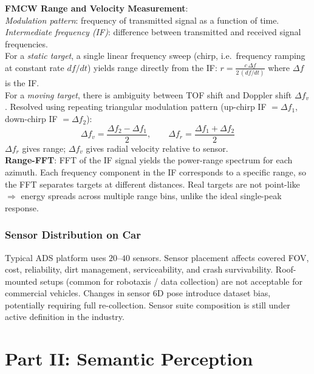 \documentclass{article}
\begin{document}
\textbf{FMCW Range and Velocity Measurement}:\\
\textit{Modulation pattern}: frequency of transmitted signal as a function of time.\\
\textit{Intermediate frequency (IF)}: difference between transmitted and received signal frequencies.\\
 
For a \textit{static target}, a single linear frequency sweep (chirp, i.e.\ frequency ramping at constant rate $df/dt$) yields range directly from the IF: $r = \frac{c\,\Delta f}{2\,(df/dt)}$ where $\Delta f$ is the IF.\\
 
For a \textit{moving target}, there is ambiguity between TOF shift and Doppler shift $\Delta f_v$. Resolved using repeating triangular modulation pattern (up-chirp IF $= \Delta f_1$, down-chirp IF $= \Delta f_2$):
\begin{equation}
    \Delta f_v = \frac{\Delta f_2 - \Delta f_1}{2}, \qquad
    \Delta f_r = \frac{\Delta f_1 + \Delta f_2}{2}
\end{equation}
$\Delta f_r$ gives range; $\Delta f_v$ gives radial velocity relative to sensor.\\

\textbf{Range-FFT}: FFT of the IF signal yields the power-range spectrum for each azimuth. Each frequency component in the IF corresponds to a specific range, so the FFT separates targets at different distances. Real targets are not point-like $\Rightarrow$ energy spreads across multiple range bins, unlike the ideal single-peak response.

\subsubsection{Sensor Distribution on Car}
Typical ADS platform uses $20$--$40$ sensors. Sensor placement affects covered FOV, cost, reliability, dirt management, serviceability, and crash survivability. Roof-mounted setups (common for robotaxis / data collection) are not acceptable for commercial vehicles. Changes in sensor 6D pose introduce dataset bias, potentially requiring full re-collection. Sensor suite composition is still under active definition in the industry.
 
 

\newpage
\section{Part II: Semantic Perception}
\end{document}
